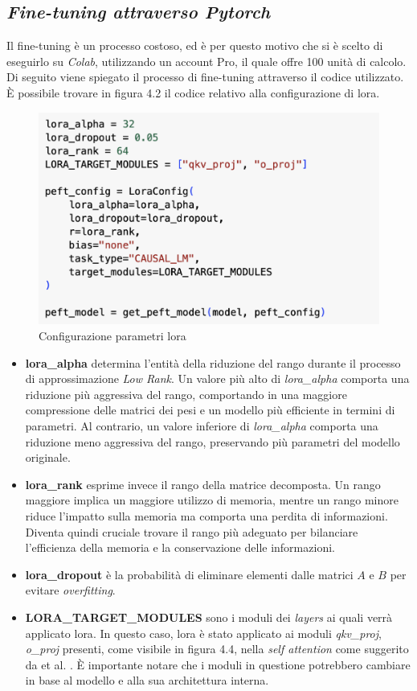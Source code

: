     \subsection{\textit{Fine-tuning attraverso Pytorch}}
     Il \gls{fine-tuning} è un processo costoso, ed è per questo motivo che si è scelto di eseguirlo su \textit{Colab}, utilizzando un account Pro, il quale offre 100 unità di calcolo. Di seguito viene spiegato il processo di \gls{fine-tuning} attraverso il codice utilizzato.
     È possibile trovare in figura 4.2 il codice relativo alla configurazione di \gls{lora}.
    \begin{figure}[!h]
        \centering        
        \includegraphics[width=12cm]{img/codiceLoRA.pdf}
        \caption{Configurazione parametri \gls{lora}}
    \end{figure}\newline
\begin{itemize}
    \item \textbf{lora\_alpha} determina l'entità della riduzione del rango durante il processo di approssimazione \textit{Low Rank}. Un valore più alto di \textit{lora\_alpha} comporta una riduzione più aggressiva del rango, comportando in una maggiore compressione delle matrici dei pesi e un modello più efficiente in termini di parametri. Al contrario, un valore inferiore di \textit{lora\_alpha} comporta una riduzione meno aggressiva del rango, preservando più parametri del modello originale.
    \item \textbf{lora\_rank} esprime invece il rango della matrice decomposta. Un rango maggiore implica un maggiore utilizzo di memoria, mentre un rango minore riduce l'impatto sulla memoria ma comporta una perdita di informazioni. Diventa quindi cruciale trovare il rango più adeguato per bilanciare l'efficienza della memoria e la conservazione delle informazioni.
    \item \textbf{lora\_dropout} è la probabilità di eliminare elementi dalle matrici $A $ e $B$ per evitare \textit{overfitting}.
    \item \textbf{LORA\_TARGET\_MODULES} sono i moduli dei \textit{layers} ai quali verrà applicato \gls{lora}. In questo caso, \gls{lora} è stato applicato ai moduli \textit{qkv\_proj}, \textit{o\_proj} presenti, come visibile in figura 4.4, nella \textit{self attention} come suggerito da et al. \cite{article:Hu2021LoRALA} .
    È importante notare che i moduli in questione potrebbero cambiare in base al modello e alla sua architettura interna.
    \end{itemize}

